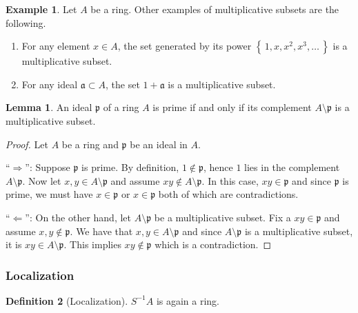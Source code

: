 \documentclass[a4paper]{book}
\theoremstyle{definition}
\newtheorem{definition}{Definition}[]
\newtheorem{example}{Example}[definition]
\newtheorem{lemma}[definition]{Lemma}
\newcommand{\set}[1]{\left\{\, #1 \,\right\}}
\begin{document}
\begin{example}
    Let \(A\) be a ring. Other examples of multiplicative subsets are the following.
    \begin{enumerate}
        \item For any element \(x \in A\), the set generated by its power \(\set{1, x, x^2, x^3, \ldots}\) is a multiplicative subset.
        \item For any ideal \(\mathfrak{a} \subset A\), the set \(1 + \mathfrak{a}\) is a multiplicative subset.
    \end{enumerate}
\end{example}

\begin{thmbox}
    \begin{lemma}
        An ideal \(\mathfrak{p}\) of a ring \(A\) is prime if and only if its complement \(A \setminus \mathfrak{p}\) is a multiplicative subset.
    \end{lemma}
\end{thmbox}
\begin{proof}
    Let \(A\) be a ring and \(\mathfrak{p}\) be an ideal in \(A\).

    ``\(\Rightarrow\)'': Suppose \(\mathfrak{p}\) is prime. By definition, \(1 \not\in \mathfrak{p}\), hence \(1\) lies in the complement \(A \setminus \mathfrak{p}\). Now let \(x,y \in A \setminus \mathfrak{p}\) and assume \(xy \not\in A \setminus \mathfrak{p}\). In this case, \(xy \in \mathfrak{p}\) and since \(\mathfrak{p}\) is prime, we must have \(x \in \mathfrak{p}\) or \(x \in \mathfrak{p}\) both of which are contradictions.

    ``\(\Leftarrow\)'': On the other hand, let \(A \setminus \mathfrak{p}\) be a multiplicative subset. Fix a \(xy \in \mathfrak{p}\) and assume \(x, y \not\in \mathfrak{p}\). We have that \(x, y \in A \setminus \mathfrak{p}\) and since \(A \setminus \mathfrak{p}\) is a multiplicative subset, it is \(xy \in A \setminus \mathfrak{p}\). This implies \(xy \not\in \mathfrak{p}\) which is a contradiction.
\end{proof}

\subsubsection{Localization}
\begin{defbox}
    \begin{definition}[Localization]
        \(S^{-1}A\) is again a ring.
    \end{definition}
\end{defbox}
\end{document}
